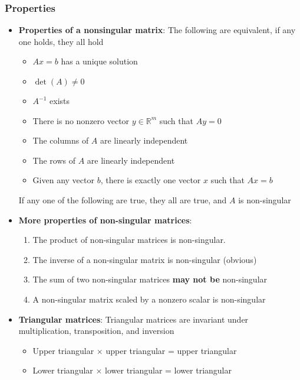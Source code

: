 \documentclass{report}
\begin{document}
    \pagebreak 
    \bigbreak \noindent 
    \subsubsection{Properties}
    \begin{itemize}
        \item \textbf{Properties of a nonsingular matrix}:
            The following are equivalent, if any one holds, they all hold
            \begin{itemize}
                \item $Ax = b$ has a unique solution
                \item $\det(A)\ne 0$
                \item $A^{-1}$ exists
                \item There is no nonzero vector $y \in \mathbb{R}^{m}$ such that $Ay=0 $
                \item The columns of $A$ are linearly independent
                \item The rows of $A$ are linearly independent
                \item Given any vector $b$, there is exactly one vector $x$ such that $Ax=b$
            \end{itemize}
            If any one of the following are true, they all are true, and $A$ is non-singular
        \item \textbf{More properties of non-singular matrices}:
            \begin{enumerate}
                \item The product of non-singular matrices is non-singular.
                \item The inverse of a non-singular matrix is non-singular (obvious)
                \item The sum of two non-singular matrices \textbf{may not be} non-singular
                \item A non-singular matrix scaled by a nonzero scalar is non-singular
            \end{enumerate}
        \item \textbf{Triangular matrices}: 
            Triangular matrices are invariant under multiplication, transposition, and inversion
            \begin{itemize}
                \item Upper triangular $\times$ upper triangular = upper triangular
                \item Lower triangular $\times$ lower triangular = lower triangular

\end{itemize}
\end{itemize}
\end{document}
